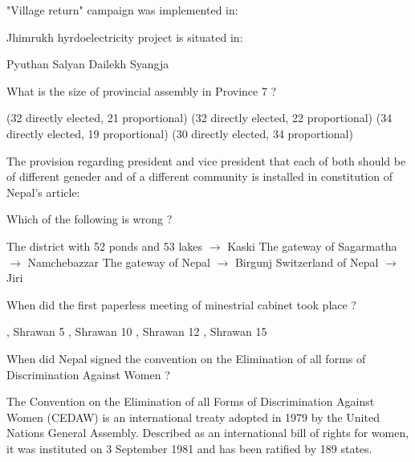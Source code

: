 \begin{questions}
\question "Village return" campaign was implemented in:
  \begin{choices}
  \end{choices}

\question Jhimrukh hyrdoelectricity project is situated in:
  \begin{choices}
  \CorrectChoice Pyuthan
  \choice Salyan
  \choice Dailekh
  \choice Syangja
  \end{choices}

\question What is the size of provincial assembly in Province 7 ?
  \begin{choices}
   (32 directly elected, 21 proportional)
   (32 directly elected, 22 proportional)
   (34 directly elected, 19 proportional)
   (30 directly elected, 34 proportional)
  \end{choices}

\question The provision regarding president and vice president that each of both should be of different geneder and of a different community is installed in constitution of Nepal's article:
  \begin{choices}
  \end{choices}

\question Which of the following is wrong ?
  \begin{choices}
  \choice The district with 52 ponds and 53 lakes $\longrightarrow$ Kaski
  \choice The gateway of Sagarmatha $\longrightarrow$ Namchebazzar
  \choice The gateway of Nepal $\longrightarrow$ Birgunj
  \choice Switzerland of Nepal $\longrightarrow$ Jiri
  \end{choices}

\question When did the first paperless meeting of minestrial cabinet took place ?
  \begin{choices}
  , Shrawan 5
  , Shrawan 10
  , Shrawan 12
  , Shrawan 15
  \end{choices}

\question When did Nepal signed the convention on the Elimination of all forms of Discrimination Against Women ?
  \begin{choices}
  \end{choices}

  \begin{solution}
  The Convention on the Elimination of all Forms of Discrimination Against Women (CEDAW) is an international treaty adopted in 1979 by the United Nations General Assembly. Described as an international bill of rights for women, it was instituted on 3 September 1981 and has been ratified by 189 states.
  \end{solution}


\end{questions}
